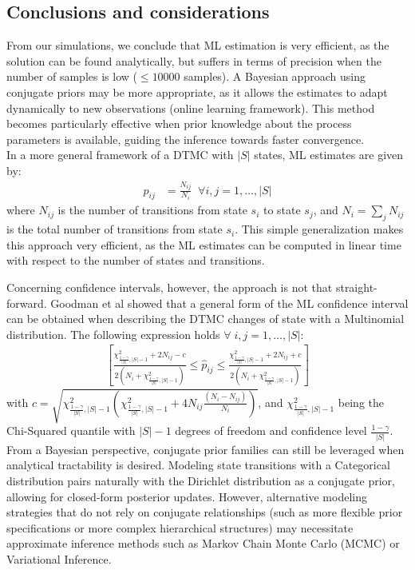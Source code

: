 \documentclass[twocolumn, 9pt]{extarticle}
\begin{document}
\subsection{Conclusions and considerations}
From our simulations, we conclude that ML estimation is very efficient, as the solution can be found analytically, but suffers
in terms of precision when the number of samples is low ($\leq 10000$ samples).
A Bayesian approach using conjugate priors may be more appropriate, as it allows the estimates to adapt dynamically to new observations (online learning framework).
This method becomes particularly effective when prior knowledge about the process parameters is available, guiding the inference towards faster convergence.\\[0.2cm]

In a more general framework of a DTMC with $|S|$ states, ML estimates are given by:
\begin{align*}
    \hat p_{ij} &= \frac{N_{ij}}{N_i} \;\;\forall i,j = 1, \dots, |S|
\end{align*}
where $N_{ij}$ is the number of transitions from state $s_i$ to state $s_j$, and $N_i = \sum_j N_{ij}$ is the total number of transitions from state $s_i$.
This simple generalization makes this approach very efficient, as the ML estimates can be computed in linear time with respect to the number of states and transitions.

Concerning confidence intervals, however, the approach is not that straight-forward. Goodman et al \cite{goodman1965paper}
showed that a general form of the ML confidence interval can be obtained when describing the DTMC changes of state with a Multinomial distribution.
The following expression holds $ \forall \; i,j=1, \dots, |S|$:
\begin{align*}
    \left[\frac{\chi^2_{\frac{1-\gamma}{|S|}, |S|-1} + 2N_{ij} -c}{2(N_i + \chi^2_{\frac{1-\gamma}{|S|}, |S|-1})} \leq \hat p_{ij} \leq \frac{\chi^2_{\frac{1-\gamma}{|S|}, |S|-1} + 2N_{ij} + c}{2(N_i + \chi^2_{\frac{1-\gamma}{|S|}, |S|-1})}\right]
\end{align*}
with $c = \sqrt{\chi^2_{\frac{1-\gamma}{|S|}, |S|-1} \left(\chi^2_{\frac{1-\gamma}{|S|}, |S|-1} + 4 N_{ij}\frac{(N_i - N_{ij})}{N_i}\right)}$, and 
$\chi^2_{\frac{1-\gamma}{|S|}, |S|-1}$ being the Chi-Squared quantile with $|S| - 1$ degrees of freedom and confidence level $\frac{1 - \gamma}{|S|}$.\\[0.1cm]

From a Bayesian perspective, conjugate prior families can still be leveraged when analytical tractability is desired. Modeling state 
transitions with a Categorical distribution pairs naturally with the Dirichlet distribution as a conjugate prior, 
allowing for closed-form posterior updates. However, alternative modeling strategies that do not rely on conjugate relationships (such as more 
flexible prior specifications or more complex hierarchical structures) may necessitate approximate inference methods such as Markov Chain Monte 
Carlo (MCMC) or Variational Inference.
\end{document}
